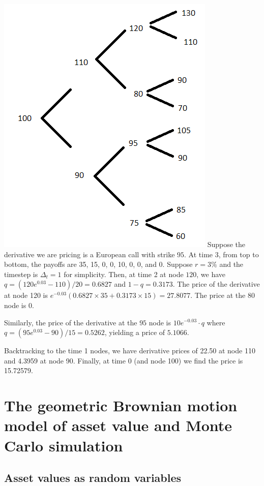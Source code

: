 \documentclass[
]{book}
\begin{document}
\includegraphics{tree_stock.png}
Suppose the derivative we are pricing is a European call with strike \(95\). At time 3, from top to bottom, the payoffs are 35, 15, 0, 0, 10, 0, 0, and 0. Suppose \(r = 3\%\) and the timestep is \(\Delta_t = 1\) for simplicity. Then, at time 2 at node \(120\), we have \(q = (120 e^{0.03} - 110)/20 = 0.6827\) and \(1-q=0.3173\). The price of the derivative at node 120 is \(e^{-0.03}(0.6827\times 35 + 0.3173 \times 15) = 27.8077\). The price at the 80 node is 0.

Similarly, the price of the derivative at the \(95\) node is \(10e^{-0.03}\cdot q\) where \(q = (95 e^{0.03} - 90)/15 = 0.5262\), yielding a price of \(5.1066\).

Backtracking to the time 1 nodes, we have derivative prices of 22.50 at node 110 and 4.3959 at node 90. Finally, at time 0 (and node 100) we find the price is 15.72579.

\hypertarget{the-geometric-brownian-motion-model-of-asset-value-and-monte-carlo-simulation}{%
\chapter{The geometric Brownian motion model of asset value and Monte Carlo simulation}\label{the-geometric-brownian-motion-model-of-asset-value-and-monte-carlo-simulation}}

\hypertarget{asset-values-as-random-variables}{%
\section{Asset values as random variables}\label{asset-values-as-random-variables}}
\end{document}
